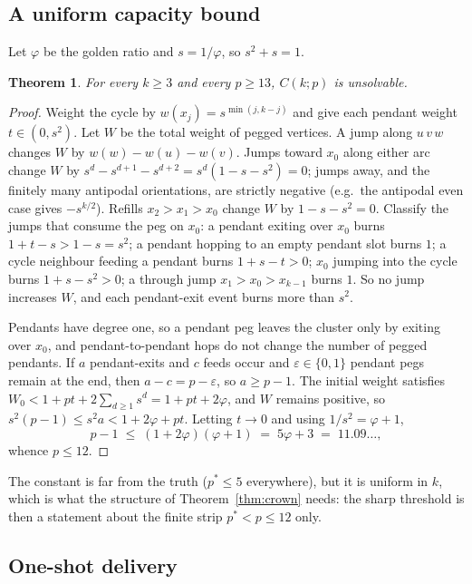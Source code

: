 \documentclass[11pt]{article}
\newtheorem{theorem}{Theorem}[section]
\theoremstyle{definition}
\begin{document}
\subsection{A uniform capacity bound}

Let $\varphi$ be the golden ratio and $s=1/\varphi$, so
$s^2+s=1$.

\begin{theorem}\label{thm:uniform}
For every $k\ge 3$ and every $p\ge 13$, $C(k;p)$ is unsolvable.
\end{theorem}

\begin{proof}
Weight the cycle by $w(x_j)=s^{\min(j,k-j)}$ and give each pendant
weight $t\in(0,s^2)$. Let $W$ be the total weight of pegged
vertices. A jump along $u\,v\,w$ changes $W$ by $w(w)-w(u)-w(v)$.
Jumps toward $x_0$ along either arc change $W$ by
$s^d-s^{d+1}-s^{d+2}=s^d(1-s-s^2)=0$; jumps away, and the finitely
many antipodal orientations, are strictly negative (e.g.\ the
antipodal even case gives $-s^{k/2}$). Refills
$x_2\!>\!x_1\!>\!x_0$ change $W$ by $1-s-s^2=0$. Classify the jumps
that consume the peg on $x_0$: a pendant exiting over $x_0$ burns
$1+t-s>1-s=s^2$; a pendant hopping to an empty pendant slot burns
$1$; a cycle neighbour feeding a pendant burns $1+s-t>0$; $x_0$
jumping into the cycle burns $1+s-s^2>0$; a through jump
$x_1\!>\!x_0\!>\!x_{k-1}$ burns $1$. So no jump increases $W$, and
each pendant-exit event burns more than $s^2$.

Pendants have degree one, so a pendant peg leaves the cluster only by
exiting over $x_0$, and pendant-to-pendant hops do not change the
number of pegged pendants. If $a$ pendant-exits and $c$ feeds occur
and $\varepsilon\in\{0,1\}$ pendant pegs remain at the end, then
$a-c=p-\varepsilon$, so $a\ge p-1$. The initial weight satisfies
$W_0<1+pt+2\sum_{d\ge1}s^d=1+pt+2\varphi$, and $W$ remains positive,
so $s^2(p-1)\le s^2a<1+2\varphi+pt$. Letting $t\to0$ and using
$1/s^2=\varphi+1$,
\[
p-1\;\le\;(1+2\varphi)(\varphi+1)\;=\;5\varphi+3\;=\;11.09\ldots,
\]
whence $p\le 12$.
\end{proof}

The constant is far from the truth ($p^*\le5$ everywhere), but it is
uniform in $k$, which is what the structure of
Theorem~\ref{thm:crown} needs: the sharp threshold is then a
statement about the finite strip $p^*<p\le 12$ only.

\subsection{One-shot delivery}
\end{document}

